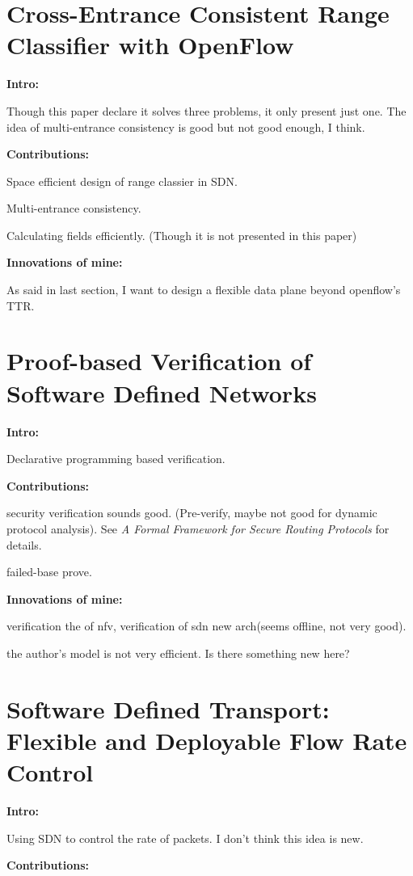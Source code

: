 \section{Cross-Entrance Consistent Range Classifier with OpenFlow}
\label{sec:2}
\textbf{Intro:}

Though this paper declare it solves three problems, it only present just one. The idea of multi-entrance consistency is good but not good enough, I think.

\noindent
\textbf{Contributions:}

Space efficient design of range classier in SDN.

Multi-entrance consistency.

Calculating fields efficiently. (Though it is not presented in this paper)

\noindent
\textbf{Innovations of mine:}

As said in last section, I want to design a flexible data plane beyond openflow's TTR.

\section{Proof-based Verification of Software Defined Networks}
\label{sec:3}
\textbf{Intro:}

Declarative programming based verification.

\noindent
\textbf{Contributions:}

security verification sounds good. (Pre-verify, maybe not good for dynamic protocol analysis). See \emph{A Formal Framework for Secure Routing Protocols} for details.

failed-base prove.

\noindent
\textbf{Innovations of mine:}

verification the of nfv, verification of sdn new arch(seems offline, not very good).

the author's model is not very efficient. Is there something new here?

\section{Software Defined Transport: Flexible and Deployable Flow Rate Control}
\label{sec:4}

\textbf{Intro:}

Using SDN to control the rate of packets. I don't think this idea is new.

\noindent
\textbf{Contributions:}

